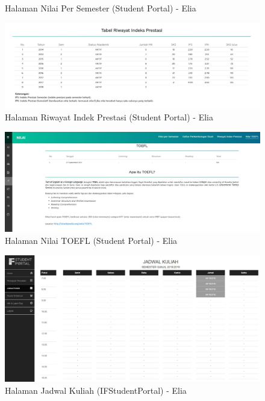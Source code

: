 \begin{itemize}
\begin{enumerate}
\begin{figure}[H]
			\caption{Halaman Nilai Per Semester (Student Portal) - Elia}
			\label{fig:2014_2_nps_studentportal}
		\end{figure}
		\begin{figure}[H]
			\centering
			\includegraphics[scale=0.45]{Gambar/HasilPengujian/2014_2_rip_studentportal}
			\caption{Halaman Riwayat Indek Prestasi (Student Portal) - Elia}
			\label{fig:2014_2_rip_studentportal}
		\end{figure}
		\begin{figure}[H]
			\centering
			\includegraphics[scale=0.35]{Gambar/HasilPengujian/2014_2_toefl_studentportal}
			\caption{Halaman Nilai TOEFL (Student Portal) - Elia}
			\label{fig:2014_2_toefl_studentportal}
		\end{figure}
		\begin{figure}[H]
			\centering
			\includegraphics[scale=0.35]{Gambar/HasilPengujian/2014_2_jadwal_kuliah_ifstudentportal}
			\caption{Halaman Jadwal Kuliah (IFStudentPortal) - Elia}

\end{figure}
\end{enumerate}
\end{itemize}
